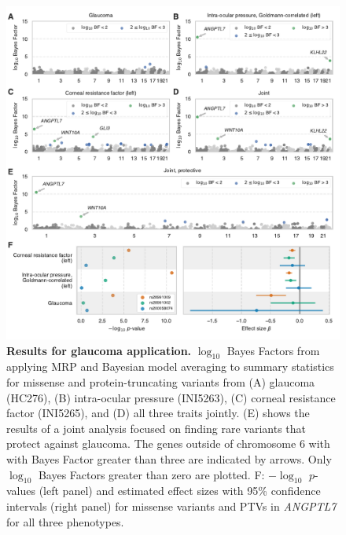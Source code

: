 \begin{figure}[!h]
\includegraphics[width=\textwidth]{../figures/Figure_04.pdf}
\caption{{\bf Results for glaucoma application.}
$\log_{10}$ Bayes Factors from applying MRP and Bayesian model averaging to summary statistics for missense and protein-truncating variants from (A) glaucoma (HC276), (B) intra-ocular pressure (INI5263), (C) corneal resistance factor (INI5265), and (D) all three traits jointly. (E) shows the results of a joint analysis focused on finding rare variants that protect against glaucoma. The genes outside of chromosome 6 with with Bayes Factor greater than three are indicated by arrows. Only $\log_{10}$ Bayes Factors greater than zero are plotted. F: $-\log_{10}$ $p$-values (left panel) and estimated effect sizes with 95\% confidence intervals (right panel) for missense variants and PTVs in \textit{ANGPTL7} for all three phenotypes.}
\label{glaucoma_bma}
\end{figure}

